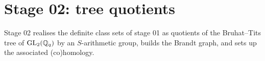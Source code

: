 \section*{Stage 02: tree quotients}\label{sec:stage-02}

Stage 02 realises the definite class sets of stage 01 as quotients of the Bruhat--Tits tree of $\mathrm{GL}_2(\mathbb{Q}_q)$
by an $S$-arithmetic group, builds the Brandt graph, and sets up the associated (co)homology.

